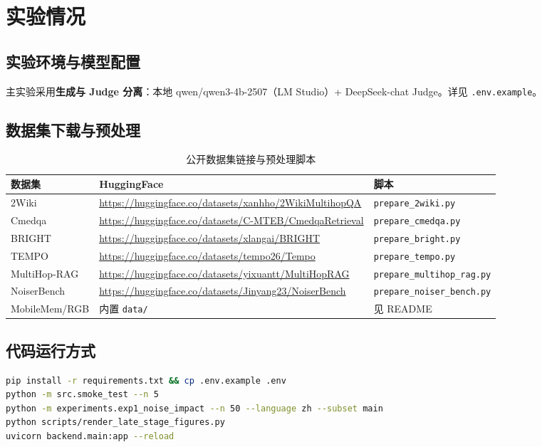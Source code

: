 \documentclass[UTF8,zihao=-4]{ctexart}
\begin{document}
\section{实验情况}

\subsection{实验环境与模型配置}
主实验采用\textbf{生成与 Judge 分离}：本地 qwen/qwen3-4b-2507（LM Studio）+ DeepSeek-chat Judge。详见 \texttt{.env.example}。

\subsection{数据集下载与预处理}
\begin{table}[H]
  \centering
  \caption{公开数据集链接与预处理脚本}
  \small
  \begin{tabularx}{\textwidth}{llY}
    \toprule
    数据集 & HuggingFace & 脚本 \\
    \midrule
    2Wiki & \url{https://huggingface.co/datasets/xanhho/2WikiMultihopQA} & \texttt{prepare\_2wiki.py} \\
    Cmedqa & \url{https://huggingface.co/datasets/C-MTEB/CmedqaRetrieval} & \texttt{prepare\_cmedqa.py} \\
    BRIGHT & \url{https://huggingface.co/datasets/xlangai/BRIGHT} & \texttt{prepare\_bright.py} \\
    TEMPO & \url{https://huggingface.co/datasets/tempo26/Tempo} & \texttt{prepare\_tempo.py} \\
    MultiHop-RAG & \url{https://huggingface.co/datasets/yixuantt/MultiHopRAG} & \texttt{prepare\_multihop\_rag.py} \\
    NoiserBench & \url{https://huggingface.co/datasets/Jinyang23/NoiserBench} & \texttt{prepare\_noiser\_bench.py} \\
    MobileMem/RGB & 内置 \texttt{data/} & 见 README \\
    \bottomrule
  \end{tabularx}
\end{table}

\subsection{代码运行方式}
\begin{lstlisting}[language=bash]
pip install -r requirements.txt && cp .env.example .env
python -m src.smoke_test --n 5
python -m experiments.exp1_noise_impact --n 50 --language zh --subset main
python scripts/render_late_stage_figures.py
uvicorn backend.main:app --reload
\end{lstlisting}
\end{document}
